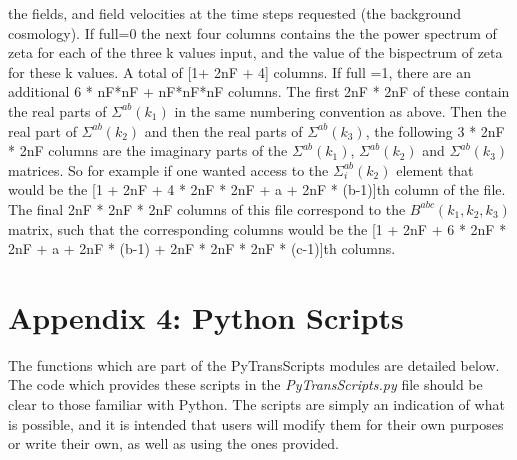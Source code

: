 \documentclass[10pt,
amsmath,amssymb,
aps,prd,nofootinbib,eqsecnum,a4paper]{revtex4}
\begin{document}
\begin{itemize}
     the fields, and field velocities at the time steps requested (the background cosmology).
    If full=0 the next four columns contains the the power spectrum of zeta 
     for each of the three k values input, and the value of the 
     bispectrum of zeta for these k values. A total of [1+ 2nF + 4] columns. If full =1, there are 
     an additional 6 * nF*nF + nF*nF*nF columns. The first 2nF * 2nF of these contain the real 
    parts of $\Sigma^{ab}(k_1)$ in the same numbering convention as above. Then the real part of 
    $\Sigma^{ab}(k_2)$ and then the real parts of $\Sigma^{ab}(k_3)$, the following 3 * 2nF * 2nF columns are 
    the imaginary parts of the $\Sigma^{ab}(k_1)$, $\Sigma^{ab}(k_2)$ and $\Sigma^{ab}(k_3)$ matrices. So for 
    example if one wanted access to the $\Sigma_i^{ab}(k_2)$ element that would be the 
    [1 + 2nF + 4 * 2nF * 2nF + a + 2nF * (b-1)]th column of the file. The final 
    2nF * 2nF * 2nF columns of this file correspond to the $B^{abc}(k_1,k_2,k_3)$ matrix, such that     
    the corresponding columns would be the [1 + 2nF + 6 * 2nF * 2nF + a + 2nF * (b-1) + 
    2nF * 2nF * 2nF * (c-1)]th columns. 
\end{itemize}

\section*{Appendix 4: Python Scripts}

The functions which are part of the PyTransScripts modules are detailed below. The code 
which provides these scripts in the {\it PyTransScripts.py} file should be clear to those familiar with Python. The scripts are  
simply an indication of what is possible, and it is intended that users will modify them for their own purposes or 
write their own, as well as using the ones provided. 
\end{document}
